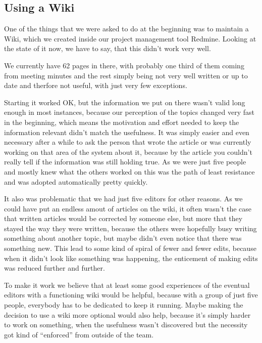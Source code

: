\subsection{Using a Wiki}

One of the things that we were asked to do at the beginning was to maintain a Wiki, which we created inside our project management tool Redmine. Looking at the state of it now, we have to say, that this didn't work very well. 

We currently have 62 pages in there, with probably one third of them coming from meeting minutes and the rest simply being not very well written or up to date and therfore not useful, with just very few exceptions.

Starting it worked OK, but the information we put on there wasn't valid long enough in most instances, because our perception of the topics changed very fast in the beginning, which means the motivation and effort needed to keep the information relevant didn't match the usefulness. It was simply easier and even necessary after a while to ask the person that wrote the article or was currently working on that area of the system about it, because by the article you couldn't really tell if the information was still holding true. As we were just five people and mostly knew what the others worked on this was the path of least resistance and was adopted automatically pretty quickly.

It also was problematic that we had just five editors for other reasons. As we could have put an endless amout of articles on the wiki, it often wasn't the case that written articles would be corrected by someone else, but more that they stayed the way they were written, because the others were hopefully busy writing something about another topic, but maybe didn't even notice that there was something new. This lead to some kind of spiral of fewer and fewer edits, because when it didn't look like something was happening, the enticement of making edits was reduced further and further.

To make it work we believe that at least some good experiences of the eventual editors with a functioning wiki would be helpful, because with a group of just five people, everybody has to be dedicated to keep it running. Maybe making the decision to use a wiki more optional would also help, because it's simply harder to work on something, when the usefulness wasn't discovered but the necessity got kind of \enquote{enforced} from outside of the team.


